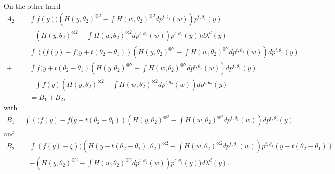 \documentclass{article}
\begin{document}
On the other hand
\begin{align*}
    A_2= & \int f(y)\Biggl(\left(H(y,\theta_2)^{\otimes 2}-\int H(w,\theta_2)^{\otimes 2} dp^{t,\theta_1}(w)\right)p^{t,\theta_1}(y)\\
    &-\left(H(y,\theta_2)^{\otimes 2}-\int H(w,\theta_2)^{\otimes 2} dp^{t,\theta_2}(w)\right)p^{t,\theta_2}(y)\Biggl)d\lambda^d(y)\\
    = & \int \left((f(y)-f(y+t(\theta_2-\theta_1)\right)\left(H(y,\theta_2)^{\otimes 2}-\int H(w,\theta_2)^{\otimes 2} dp^{t,\theta_1}(w)\right)dp^{t,\theta_1}(y)\\
    + & \int f(y+t(\theta_2-\theta_1)\left(H(y,\theta_2)^{\otimes 2}-\int H(w,\theta_2)^{\otimes 2} dp^{t,\theta_1}(w)\right)dp^{t,\theta_1}(y)\\
    &- \int f(y)\left(H(y,\theta_2)^{\otimes 2}-\int H(w,\theta_2)^{\otimes 2} dp^{t,\theta_2}(w)\right)dp^{t,\theta_2}(y)\\
    & = B_1+B_2,
\end{align*}
with 
\begin{align*}
    B_1 =\int \left((f(y)-f(y+t(\theta_2-\theta_1)\right)\left(H(y,\theta_2)^{\otimes 2}-\int H(w,\theta_2)^{\otimes 2} dp^{t,\theta_1}(w)\right)dp^{t,\theta_1}(y)
\end{align*}
and 
\begin{align*}
    B_2 =& \int (f(y)-\xi)\Biggl(\left( H(y-t(\theta_2-\theta_1),\theta_2)^{\otimes 2} -\int H(w,\theta_2)^{\otimes 2} dp^{t,\theta_1}(w)\right)p^{t,\theta_1}(y-t(\theta_2-\theta_1))\\
     & - \left(H(y,\theta_2)^{\otimes 2}-\int H(w,\theta_2)^{\otimes 2} dp^{t,\theta_2}(w)\right)p^{t,\theta_2}(y)\Biggl)d\lambda^d(y).
\end{align*}
\end{document}
